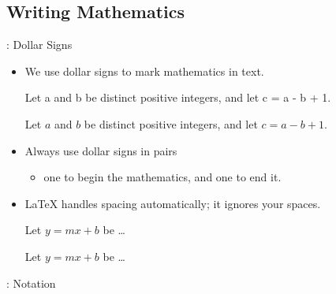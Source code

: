 \documentclass{beamer}
\begin{document}
\subsection*{Writing Mathematics}
\begin{frame}[fragile]{\insertsubsection{}: Dollar Signs}
\begin{itemize}
\item We use dollar signs \keystrokebftt{\$} to mark mathematics in text.\\[1ex]
\begin{exampletwouptiny}
Let a and b be distinct positive
integers, and let c = a - b + 1.

Let $a$ and $b$ be distinct positive
integers, and let $c = a - b + 1$.
\end{exampletwouptiny}
\item Always use dollar signs in pairs
\begin{itemize}
  \item one to begin the mathematics, and one to end it.
\end{itemize}
\item \LaTeX{} handles spacing automatically; it ignores your spaces.
\begin{exampletwouptiny}
Let $y=mx+b$ be \ldots

Let $y = m x + b$ be \ldots
\end{exampletwouptiny}
\end{itemize}
\end{frame}

\begin{frame}[fragile]{\insertsubsection{}: Notation}
\end{frame}
\end{document}
